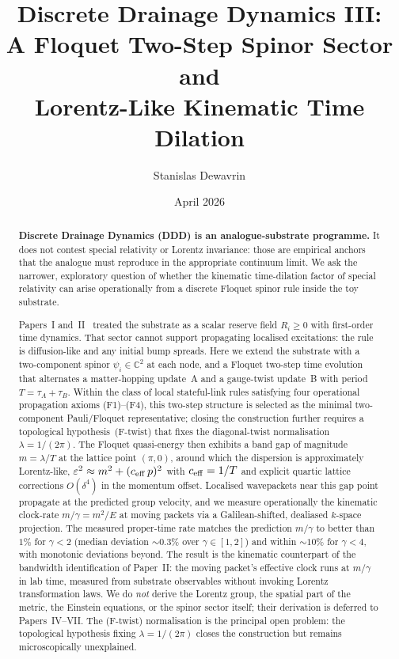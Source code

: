 \documentclass[11pt,a4paper]{article}
\title{\textbf{Discrete Drainage Dynamics III:\\
A Floquet Two-Step Spinor Sector and\\
Lorentz-Like Kinematic Time Dilation}}
\author[1]{Stanislas Dewavrin}
\affil[1]{Independent researcher \\ \texttt{dewavrin.iphone@gmail.com}}
\date{April 2026}
\begin{document}
\maketitle

\begin{abstract}
\noindent
\textbf{Discrete Drainage Dynamics (DDD) is an analogue-substrate
programme.} It does not contest special relativity or Lorentz
invariance: those are empirical anchors that the analogue must
reproduce in the appropriate continuum limit. We ask the
narrower, exploratory question of whether the kinematic
time-dilation factor of special relativity can arise
operationally from a discrete Floquet spinor rule inside the
toy substrate.

Papers~I and~II~\cite{paperI, paperII} treated the substrate as
a scalar reserve field $R_i \ge 0$ with first-order time
dynamics. That sector cannot
support propagating localised excitations: the rule is
diffusion-like and any initial bump spreads. Here we extend the
substrate with a two-component spinor $\psi_i \in \mathbb{C}^2$
at each node, and a Floquet two-step time evolution that
alternates a matter-hopping update~A and a gauge-twist update~B
with period $T = \tau_A + \tau_B$. Within the class of local
stateful-link rules satisfying four operational propagation
axioms (F1)--(F4), this two-step structure is selected as the
minimal two-component Pauli/Floquet representative; closing the
construction further requires a topological hypothesis~(F-twist)
that fixes the diagonal-twist normalisation
$\lambda = 1/(2\pi)$. The Floquet quasi-energy then exhibits a
band gap of magnitude $m = \lambda/T$ at the lattice
point $(\pi, 0)$, around which the dispersion is approximately
Lorentz-like, $\varepsilon^2 \approx m^2 + (c_{\rm eff}\, p)^2$
with $c_{\rm eff} = 1/T$ and explicit quartic lattice
corrections $O(\delta^4)$ in the momentum offset. Localised
wavepackets near this gap point propagate at the predicted
group velocity, and we measure operationally the kinematic
clock-rate $m/\gamma = m^2/E$ at moving packets via a
Galilean-shifted, dealiased $k$-space projection. The measured
proper-time rate matches the prediction $m/\gamma$ to better
than $1\%$ for $\gamma < 2$ (median deviation $\sim 0.3\%$ over
$\gamma \in [1, 2]$) and within $\sim 10\%$ for $\gamma < 4$,
with monotonic deviations beyond. The result is the kinematic
counterpart of the bandwidth identification of Paper~II: the
moving packet's effective clock runs at $m/\gamma$ in lab time,
measured from substrate observables without invoking Lorentz
transformation laws. We do \emph{not} derive the Lorentz group, the spatial part of
the metric, the Einstein equations, or the spinor sector
itself; their derivation is deferred to Papers~IV--VII. The
(F-twist) normalisation is the principal open problem: the
topological hypothesis fixing $\lambda = 1/(2\pi)$ closes the
construction but remains microscopically unexplained.
\end{abstract}
\end{document}
